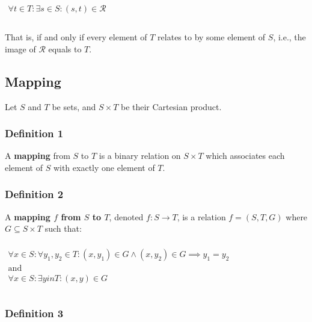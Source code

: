 \begin{math}
  \begin{array}{c}
    \\
    \forall t \in T: \exists s \in S: (s, t) \in \mathcal{R} \\
    \\
  \end{array}
\end{math}

That is, if and only if every element of $T$ relates to by some
element of $S$, i.e., the image of $\mathcal{R}$ equals to $T$.





\subsection{Mapping}
\label{sec:mapping}

Let $S$ and $T$ be sets, and $S \times T$ be their Cartesian product.


\subsubsection{Definition 1}

A \textbf{mapping} from $S$ to $T$ is a binary relation on
$S \times T$ which associates each element of $S$ with exactly one
element of $T$.

\subsubsection{Definition 2}

A \textbf{mapping $f$ from $S$ to $T$}, denoted $f: S \to T$, is a
relation $f = (S, T, G)$ where $G \subseteq S \times T$ such that:

\begin{math}
  \begin{array}{l}
    \\
    \forall x \in S: \forall y_1, y_2 \in T: (x, y_1) \in G \land (x, y_2) \in G \implies y_1 = y_2 \\
    \text{and} \\
    \forall x \in S: \exists y in T: (x, y) \in G \\
    \\
  \end{array}
\end{math}

\subsubsection{Definition 3}

